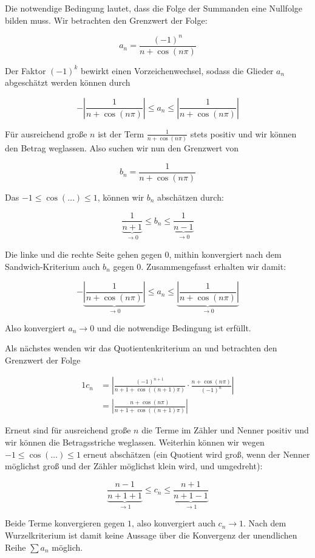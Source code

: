 \item Die notwendige Bedingung lautet, dass die Folge der Summanden eine Nullfolge bilden muss. Wir betrachten den Grenzwert der Folge:

$$
	a_n = \frac{(-1)^n}{n+\cos(n\pi)}
$$

Der Faktor $(-1)^k$ bewirkt einen Vorzeichenwechsel, sodass die Glieder $a_n$  abgeschätzt werden können durch

$$
 -\left|\frac{1}{n+\cos(n\pi)}\right| \le a_n \le \left|\frac{1}{n+\cos(n\pi)}\right|
$$

Für ausreichend große $n$ ist der Term $\frac{1}{n+\cos(n\pi)}$ stets positiv und wir können den Betrag weglassen. Also suchen wir nun den Grenzwert von

$$
 b_n = \frac{1}{n+\cos(n\pi)}
$$

Das $-1 \le \cos(\dots) \le 1$, können wir $b_n$ abschätzen durch:

$$
	\underbrace{\frac{1}{n+1}}_{\to 0} \le b_n \le \underbrace{\frac{1}{n-1}}_{\to 0}
$$

Die linke und die rechte Seite gehen gegen $0$, mithin konvergiert nach dem Sandwich-Kriterium auch $b_n$ gegen $0$. Zusammengefasst erhalten wir damit:

$$
-\underbrace{\left|\frac{1}{n+\cos(n\pi)}\right|}_{\to 0} \le a_n \le \underbrace{\left|\frac{1}{n+\cos(n\pi)}\right|}_{\to 0}
$$

Also konvergiert $a_n \to 0$ und die notwendige Bedingung ist erfüllt.

Als nächstes wenden wir das Quotientenkriterium an und betrachten den Grenzwert der Folge

\begin{alignat*}{1}
	c_n &= \left| \frac{(-1)^{n+1}}{n+1+\cos((n+1)\pi)} \cdot \frac{n+\cos(n\pi)}{(-1)^n} \right| \\
	    &= \left| \frac{n+\cos(n\pi)}{n+1+\cos((n+1)\pi)} \right|
\end{alignat*}

Erneut sind für ausreichend große $n$ die Terme im Zähler und Nenner positiv und wir können die Betragsstriche weglassen. Weiterhin können wir wegen $-1 \le \cos(\dots) \le 1$ erneut abschätzen (ein Quotient wird groß, wenn der Nenner möglichst groß und der Zähler möglichst klein wird, und umgedreht):

$$
 \underbrace{\frac{n-1}{n+1+1}}_{\to 1}	\le c_n \le \underbrace{\frac{n+1}{n+1-1}}_{\to 1}
$$

Beide Terme konvergieren gegen $1$, also konvergiert auch $c_n \to 1$. Nach dem Wurzelkriterium ist damit keine Aussage über die Konvergenz der unendlichen Reihe $\sum\limits a_n$ möglich.
